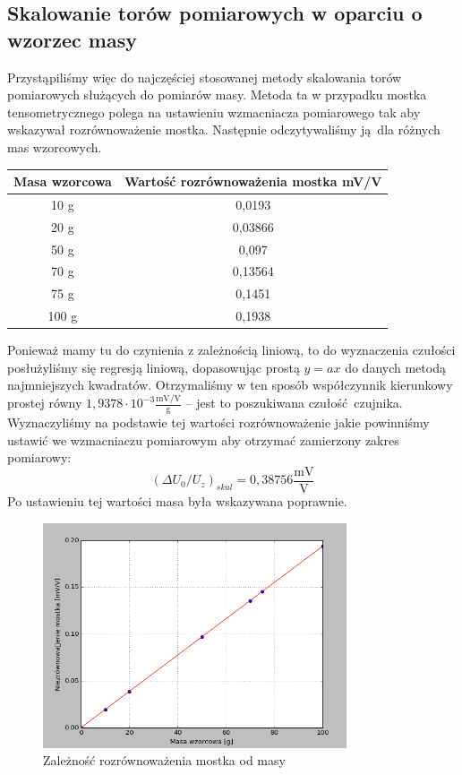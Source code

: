 \documentclass[a4paper, 12pt, titlepage]{article}
\begin{document}
		\subsection{Skalowanie torów pomiarowych w oparciu o wzorzec masy}
			Przystąpiliśmy więc do najczęściej stosowanej metody skalowania torów pomiarowych służących do pomiarów masy. Metoda ta w przypadku mostka tensometrycznego polega na ustawieniu wzmacniacza pomiarowego tak aby wskazywał rozrównoważenie mostka. Następnie odczytywaliśmy ją dla różnych mas wzorcowych. 
			\begin{center}
				\begin{tabular}{|c|c|}\hline
					Masa wzorcowa & Wartość rozrównoważenia mostka mV/V \\ \hline
					10 g & 0,0193 \\ \hline
					20 g & 0,03866 \\ \hline
					50 g & 0,097 \\ \hline
					70 g & 0,13564 \\ \hline
					75 g & 0,1451 \\ \hline
					100 g & 0,1938 \\ \hline
				\end{tabular} 
			\end{center}
			Ponieważ mamy tu do czynienia z zależnością liniową, to do wyznaczenia czułości posłużyliśmy się regresją liniową, dopasowując prostą $y = ax$ do danych metodą najmniejszych kwadratów. Otrzymaliśmy w ten sposób współczynnik kierunkowy prostej równy $1,9378 \cdot 10^{-3} \mathrm{\frac{mV/V}{g}}$ -- jest to poszukiwana czułość czujnika.
			\newline 
			\newline 
			Wyznaczyliśmy na podstawie tej wartości rozrównoważenie jakie powinniśmy ustawić we wzmacniaczu pomiarowym aby otrzymać zamierzony zakres pomiarowy:
			$$
				(\Delta U_0 / U_z)_{skal} = 0,38756 \mathrm{\frac{mV}{V}}
			$$
			Po ustawieniu tej wartości masa była wskazywana poprawnie.
			\begin{figure}[H]
				\centering
				\includegraphics[width=0.8\textwidth]{img/wykresik.png}
				\caption{\small{Zależność rozrównoważenia mostka od masy}}
			\end{figure}  \noindent
\end{document}

